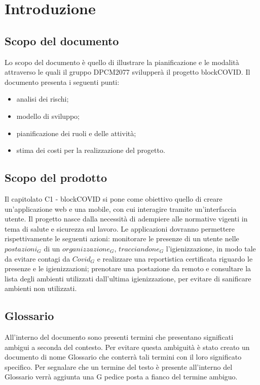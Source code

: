 \section{Introduzione}

\subsection{Scopo del documento}
Lo scopo del documento è quello di illustrare la pianificazione e le modalità attraverso le quali il gruppo DPCM2077 svilupperà il progetto blockCOVID.
Il documento presenta i seguenti punti:
\begin{itemize}
	\item analisi dei rischi;
	\item modello di sviluppo;
	\item pianificazione dei ruoli e delle attività;
	\item stima dei costi per la realizzazione del progetto.
\end{itemize}

\subsection{Scopo del prodotto}
Il capitolato C1 - blockCOVID si pone come obiettivo quello di creare un'applicazione web e una mobile,
con cui interagire tramite un’interfaccia utente.
Il progetto nasce dalla necessità di adempiere alle normative vigenti in tema di salute e sicurezza sul lavoro.
Le applicazioni dovranno permettere rispettivamente le seguenti azioni: monitorare le presenze di un utente nelle $postazioni_G$ di un $organizzazione_G$,
$tracciandone_G$ l'igienizzazione, in modo tale da evitare contagi da $Covid_G$ e realizzare una reportistica certificata riguardo 
le presenze e le igienizzazioni; prenotare una postazione da remoto e consultare la lista degli ambienti utilizzati 
dall'ultima igienizzazione, per evitare di sanificare ambienti non utilizzati.

\subsection{Glossario}
All'interno del  documento sono presenti termini che presentano significati ambigui a seconda del contesto.
Per evitare questa ambiguità è stato creato un  documento di nome Glossario che  conterrà tali termini con il loro significato specifico. Per segnalare che un termine del testo è presente all'interno del Glossario  
verrà aggiunta una G pedice posta a fianco del termine ambiguo. 

